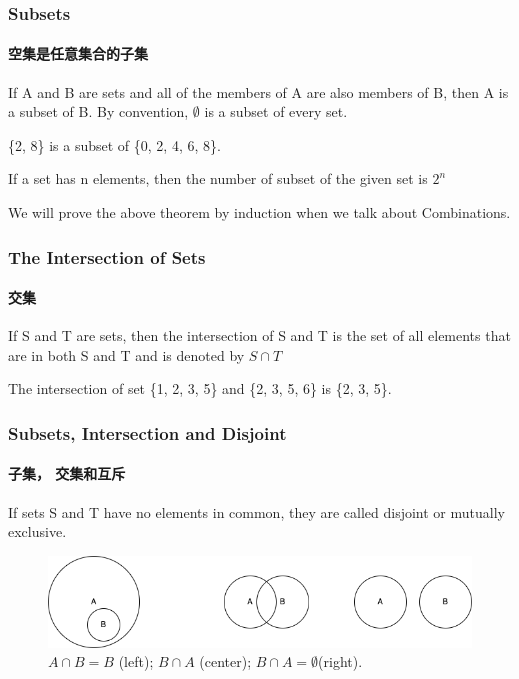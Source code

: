 \documentclass[
	11pt, %
]{beamer}
\begin{document}

\begin{frame}
	\frametitle{Subsets} %
	\framesubtitle{空集是任意集合的子集}
	\begin{definition}
	If A and B are sets and all of the
members of A are also members of B, then A is a subset of B. By convention, $\emptyset$ is a subset of
every set.
	\end{definition}
	\begin{example}
		\{2, 8\} is a subset of \{0, 2, 4, 6, 8\}.
	\end{example}

	\begin{theorem}
		If a set has n elements, then the number of subset of the given set is $2^n$
	\end{theorem}
	\alert{We will prove the above theorem by induction when we talk about Combinations.}
\end{frame}


\begin{frame}
	\frametitle{The Intersection of Sets} %
	\framesubtitle{交集}
	\begin{definition}
If S and T are sets, then the
intersection of S and T is the set of all elements that are in both S and T and
is denoted by $S \cap	T$
	\end{definition}
	\begin{example}
		The intersection of set \{1, 2, 3, 5\} and \{2, 3, 5, 6\} is \{2, 3, 5\}.
	\end{example}
\end{frame}

\begin{frame}
	\frametitle{Subsets, Intersection and Disjoint} %
	\framesubtitle{子集， 交集和互斥}
	\begin{definition}
If sets S and T have no
elements in common, they are called \alert{disjoint} or \alert{mutually exclusive}.
	\end{definition}

		\begin{figure}
		\includegraphics[width=\linewidth]{Disjoint.png}
		\caption{$A\cap B = B$ (left); $B\cap A$ (center); $B \cap A = \emptyset $(right).}
	\end{figure}
\end{frame}
\end{document}

